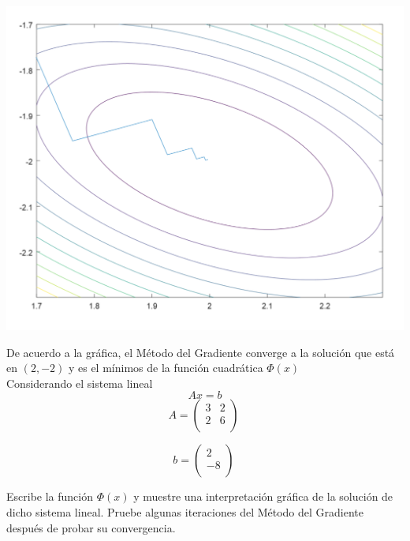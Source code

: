 \begin{center}
    \includegraphics[scale=0.5]{AlfioQuarteroni/Victor.png} 
\end{center}

De acuerdo a la gráfica, el Método del Gradiente converge a la solución que está en $(2,-2)$ y es el mínimos de la función cuadrática $\Phi(x)$\\


Considerando el sistema lineal
$$ Ax=b$$
$$ A=\begin{pmatrix}
     3 &  2 \\
     2 &  6 \\
    \end{pmatrix}\ $$
    
$$ b=\begin{pmatrix}
     2 \\
     -8 \\
    \end{pmatrix}\ $$
    
Escribe la función $ \Phi(x) $ y muestre una interpretación gráfica de la solución de dicho sistema lineal. Pruebe algunas iteraciones del Método del Gradiente después de probar su convergencia.\\

